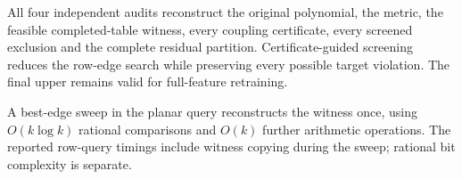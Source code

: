 All four independent audits reconstruct the original polynomial, the metric, the feasible completed-table witness, every coupling certificate, every screened exclusion and the complete residual partition. Certificate-guided screening reduces the row-edge search while preserving every possible target violation. The final upper remains valid for full-feature retraining.

A best-edge sweep in the planar query reconstructs the witness once, using $O(k\log k)$ rational comparisons and $O(k)$ further arithmetic operations. The reported row-query timings include witness copying during the sweep; rational bit complexity is separate.
